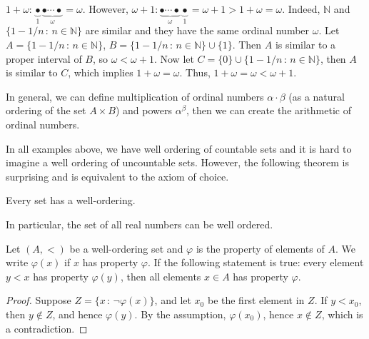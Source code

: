 \begin{example}
$1 + \omega: \underbrace{\bullet}_{1} \underbrace{\bullet \cdots \bullet}_{\omega} = \omega$. However, $\omega + 1: \underbrace{\bullet \cdots \bullet}_{\omega}  \underbrace{\bullet}_{1} = \omega + 1 > 1 + \omega = \omega$. Indeed, $\mathbb{N}$ and $\{1 - 1/n\,:\,n \in \mathbb{N}\}$ are similar and they have the same ordinal number $\omega$. Let $A = \{1 - 1/n\,:\,n \in \mathbb{N}\}$, $B = \{1 - 1/n\,:\,n \in \mathbb{N}\} \cup \{1\}$. Then $A$ is similar to a proper interval of $B$, so $\omega < \omega + 1$. Now let $C = \{0\} \cup \{1 - 1/n\,:\,n \in \mathbb{N}\}$, then $A$ is similar to $C$, which implies $1 + \omega = \omega$. Thus, $1 + \omega = \omega < \omega + 1$.
\end{example}

\medskip

In general, we can define multiplication of ordinal numbers $\alpha \cdot \beta$ (as a natural ordering of the set $A \times B$) and powers $\alpha^\beta$, then we can create the arithmetic of ordinal numbers.

In all examples above, we have well ordering of countable sets and it is hard to imagine a well ordering of uncountable sets. However, the following theorem is surprising and is equivalent to the axiom of choice.

\medskip

\begin{theorem}
Every set has a well-ordering.
\end{theorem}

\medskip

\begin{remark}
In particular, the set of all real numbers can be well ordered.
\end{remark}


\medskip

\begin{theorem}
Let $(A,<)$ be a well-ordering set and $\varphi$ is the property of elements of $A$. We write $\varphi(x)$ if $x$ has property $\varphi$. If the following statement is true: every element $y < x$ has property $\varphi(y)$, then all elements $x \in A$ has property $\varphi$.
\end{theorem}
\begin{proof}
Suppose $Z = \{x \, :\, \neg \varphi(x)\}$, and let $x_0$ be the first element in $Z$. If $y < x_0$, then $y \notin Z$, and hence $\varphi(y)$. By the assumption, $\varphi(x_0)$, hence $x \notin Z$, which is a contradiction.
\end{proof}

\medskip